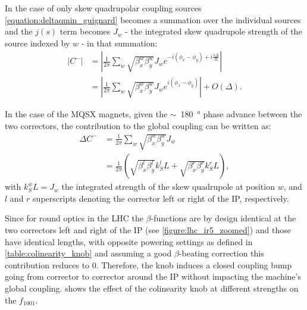 In the case of only skew quadrupolar coupling sources \cref{equation:deltaqmin_guignard} becomes a summation over the individual sources and the \(j(s)\) term becomes \(J_w\) - the integrated skew quadrupole strength of the source indexed by \(w\) - in that summation:
\begin{equation}
    \begin{aligned}
        \left| C^{-} \right| &= \left| \frac{1}{2 \pi} \sum_w \sqrt{\beta_x^w \beta_y^w} J_w e^{-i \left( \phi_x-\phi_y \right) + i \frac{s \Delta}{R}} \right| \\
                             &= \left| \frac{1}{2 \pi} \sum_w \sqrt{\beta_x^w \beta_y^w} J_w e^{i \left( \phi_x-\phi_y \right)} \right| + O(\Delta) .
    \end{aligned}
    \label{equation:deltaqmin_guignard_singular}
\end{equation}

In the case of the MQSX magnets, given the \(\sim\)~\qty{180}{\degree} phase advance between the two correctors, the contribution to the global coupling can be written as:
\begin{equation}
    \begin{aligned}
        \Delta C^{-} &= \frac{1}{2 \pi} \sum_w \sqrt{\beta_x^w \beta_y^w} J_w \\
                     &= \frac{1}{2 \pi} \left( \sqrt{\beta_x^l \beta_y^l} k_S^l L + \sqrt{\beta_x^r \beta_y^r} k_S^r L \right) ,
    \end{aligned}
    \label{equation:deltaqmin_only_mqsxs}
\end{equation}
with \(k_S^w L = J_w\) the integrated strength of the skew quadrupole at position \(w\), and \(l\) and \(r\) superscripts denoting the corrector left or right of the IP, respectively.
\newline

Since for round optics in the LHC the \(\beta\)-functions are by design identical at the two correctors left and right of the IP (see \cref{figure:lhc_ir5_zoomed}) and those have identical lengths, with opposite powering settings as defined in \cref{table:colinearity_knob} and assuming a good \(\beta\)-beating correction this contribution reduces to \num{0}.
Therefore, the knob induces a closed coupling bump going from corrector to corrector around the IP without impacting the machine's global coupling.
 shows the effect of the colinearity knob at different strengths on the \(f_{1001}\).

